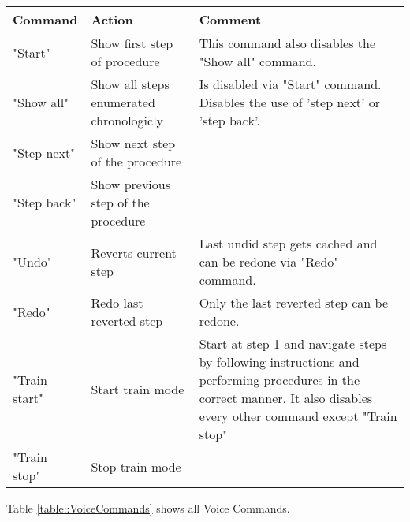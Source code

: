 \begin{center}
    \label{table::VoiceCommands}
    \begin{tabular}{ | l | p{4cm} | p{8cm} |}
    \hline
    Command & Action & Comment \\ \hline
    "Start" & Show first step of procedure & This command also disables the "Show all" command. \\ \hline
    "Show all" & Show all steps enumerated chronologicly & Is disabled via "Start" command. \newline
    Disables the use of 'step next' or 'step back'. \\ \hline
    "Step next" & Show next step of the procedure & \\ \hline
    "Step back" & Show previous step of the procedure & \\ \hline
    "Undo" & Reverts current step & Last undid step gets cached and can be redone via "Redo" command. \\ \hline
    "Redo" & Redo last reverted step & Only the last reverted step can be redone. \\ \hline
    "Train start" & Start train mode & Start at step 1 and navigate steps by following instructions and performing procedures in the correct manner.
    It also disables every other command except "Train stop" \\ \hline
    "Train stop" & Stop train mode & \\ \hline
    \end{tabular}
\end{center}

Table \ref{table::VoiceCommands} shows all Voice Commands.